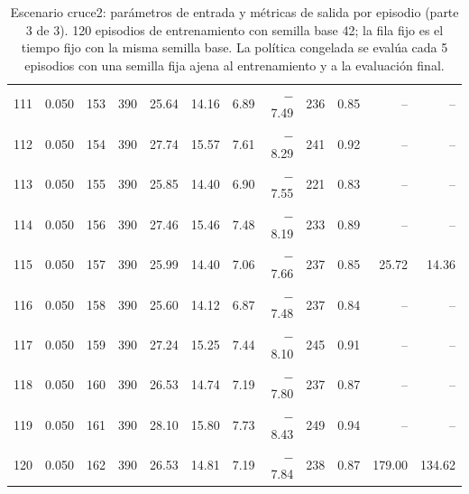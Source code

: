 \begin{table}[H]
\begin{tabular}{rrrrrrrrrrrr}
111 & 0.050 & 153 & 390 & 25.64 & 14.16 & 6.89 & $-$7.49 & 236 & 0.85 & -- & -- \\
112 & 0.050 & 154 & 390 & 27.74 & 15.57 & 7.61 & $-$8.29 & 241 & 0.92 & -- & -- \\
113 & 0.050 & 155 & 390 & 25.85 & 14.40 & 6.90 & $-$7.55 & 221 & 0.83 & -- & -- \\
114 & 0.050 & 156 & 390 & 27.46 & 15.46 & 7.48 & $-$8.19 & 233 & 0.89 & -- & -- \\
115 & 0.050 & 157 & 390 & 25.99 & 14.40 & 7.06 & $-$7.66 & 237 & 0.85 & 25.72 & 14.36 \\
116 & 0.050 & 158 & 390 & 25.60 & 14.12 & 6.87 & $-$7.48 & 237 & 0.84 & -- & -- \\
117 & 0.050 & 159 & 390 & 27.24 & 15.25 & 7.44 & $-$8.10 & 245 & 0.91 & -- & -- \\
118 & 0.050 & 160 & 390 & 26.53 & 14.74 & 7.19 & $-$7.80 & 237 & 0.87 & -- & -- \\
119 & 0.050 & 161 & 390 & 28.10 & 15.80 & 7.73 & $-$8.43 & 249 & 0.94 & -- & -- \\
120 & 0.050 & 162 & 390 & 26.53 & 14.81 & 7.19 & $-$7.84 & 238 & 0.87 & 179.00 & 134.62 \\
\bottomrule
\end{tabular}
\caption[Escenario cruce2: episodios de entrenamiento (parte 3 de 3)]{Escenario cruce2: parámetros de entrada y métricas de salida por episodio (parte 3 de 3). 120 episodios de entrenamiento con semilla base 42; la fila fijo es el tiempo fijo con la misma semilla base. La política congelada se evalúa cada 5 episodios con una semilla fija ajena al entrenamiento y a la evaluación final.}
\label{tab:cruce2-episodios-3}
\end{table}

